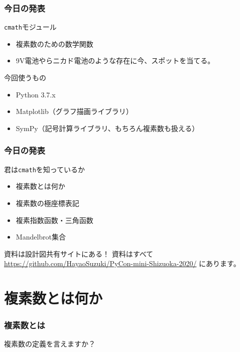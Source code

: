 \documentclass[dvipdfmx,11pt,notheorems]{beamer}
\theoremstyle{definition}
\begin{document}
\begin{frame}\frametitle{今日の発表}

\begin{block}{\texttt{cmath}モジュール}
\begin{itemize}
\item 複素数のための数学関数
\item 9V電池やらニカド電池のような存在に今、スポットを当てる。
\end{itemize}
\end{block}

\begin{block}{今回使うもの}
\begin{itemize}
\item Python 3.7.x
\item Matplotlib（グラフ描画ライブラリ）
\item SymPy（記号計算ライブラリ、もちろん複素数も扱える）
\end{itemize}
\end{block}

\end{frame}

\begin{frame}\frametitle{今日の発表}

\begin{block}{君は\texttt{cmath}を知っているか}
\begin{itemize}
\item 複素数とは何か
\item 複素数の極座標表記
\item 複素指数函数・三角函数
\item Mandelbrot集合
\end{itemize}
\end{block}

\begin{exampleblock}{資料は設計図共有サイトにある！}
資料はすべて
\url{https://github.com/HayaoSuzuki/PyCon-mini-Shizuoka-2020/}
にあります。
\end{exampleblock}

\end{frame}

\section{複素数とは何か}

\begin{frame}\frametitle{複素数とは}

\begin{center}
\Huge{複素数の定義を言えますか？}
\end{center}

\end{frame}
\end{document}
